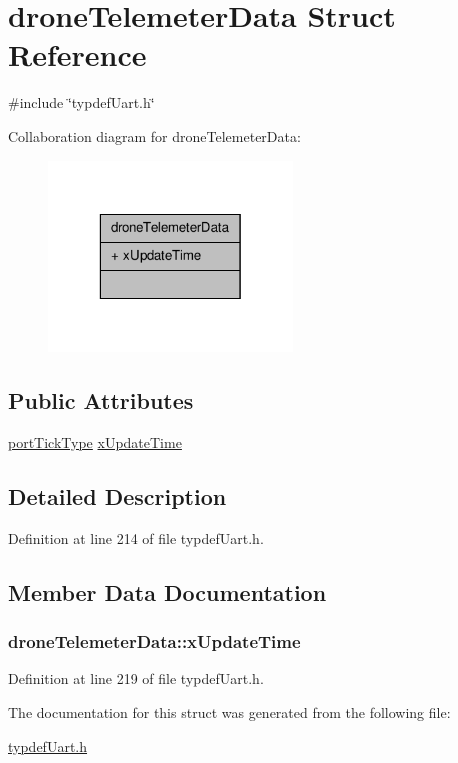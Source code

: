 \hypertarget{structdroneTelemeterData}{\section{drone\-Telemeter\-Data Struct Reference}
\label{structdroneTelemeterData}
}


{\ttfamily \#include \char`\"{}typdef\-Uart.\-h\char`\"{}}



Collaboration diagram for drone\-Telemeter\-Data\-:\nopagebreak
\begin{figure}[H]
\begin{center}
\leavevmode
\includegraphics[width=184pt]{structdroneTelemeterData__coll__graph}
\end{center}
\end{figure}
\subsection*{Public Attributes}
\begin{DoxyCompactItemize}
\item 
\hyperlink{typdefUart_8h_ae9fa5e001303f1be1c0294f26cde8caf}{port\-Tick\-Type} \hyperlink{structdroneTelemeterData_ae1463929a7d9d3b5ef29137e92472f31}{x\-Update\-Time}
\end{DoxyCompactItemize}


\subsection{Detailed Description}


Definition at line 214 of file typdef\-Uart.\-h.



\subsection{Member Data Documentation}
\hypertarget{structdroneTelemeterData_ae1463929a7d9d3b5ef29137e92472f31}{
\subsubsection[{x\-Update\-Time}]{ drone\-Telemeter\-Data\-::x\-Update\-Time}}\label{structdroneTelemeterData_ae1463929a7d9d3b5ef29137e92472f31}


Definition at line 219 of file typdef\-Uart.\-h.



The documentation for this struct was generated from the following file\-:\begin{DoxyCompactItemize}
\item 
\hyperlink{typdefUart_8h}{typdef\-Uart.\-h}\end{DoxyCompactItemize}
